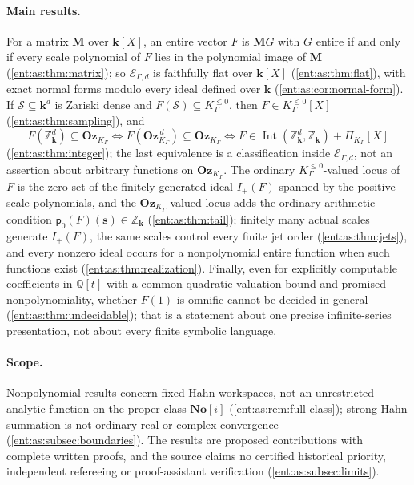\documentclass[11pt]{article}
\theoremstyle{plain}
\theoremstyle{plain}
\theoremstyle{plain}
\theoremstyle{definition}
\theoremstyle{definition}
\theoremstyle{definition}
\theoremstyle{definition}
\theoremstyle{remark}
\newcommand{\Q}{\mathbb Q}\newcommand{\Z}{\mathbb Z}\newcommand{\N}{\mathbb N}
\newcommand{\No}{\mathbf{No}}
\newcommand{\K}{K_\Gamma}\newcommand{\KD}{K_\Delta}
\newcommand{\kk}{\mathbf k}\newcommand{\PP}{\mathbb P}
\newcommand{\Oz}{\mathbf{Oz}}\newcommand{\Ed}{\mathcal E_{\Gamma,d}}
\newcommand{\Kle}{K_\Gamma^{\le0}}\DeclareMathOperator{\Jac}{Jac}
\newcommand{\Zk}{\Z_{\kk}}\newcommand{\OzK}{\Oz_{\K}}
\newcommand{\PiK}{\Pi_{\K}}\newcommand{\pg}{\mathsf p}
\DeclareMathOperator{\Int}{Int}\DeclareMathOperator{\ct}{ct}
\begin{document}
\paragraph{Main results.} For a matrix $\mathbf M$ over $\kk[X]$, an entire
vector $F$ is $\mathbf MG$ with $G$ entire if and only if every scale
polynomial of $F$ lies in the polynomial image of $\mathbf M$
(\cref{ent:as:thm:matrix}); so $\Ed$ is faithfully flat over $\kk[X]$
(\cref{ent:as:thm:flat}), with exact normal forms modulo every ideal defined
over $\kk$ (\cref{ent:as:cor:normal-form}). If $\mathcal S\subseteq\kk^d$ is
Zariski dense and $F(\mathcal S)\subseteq\Kle$, then $F\in\Kle[X]$
(\cref{ent:as:thm:sampling}), and
\begin{equation}\label{ent:as:eq:int-intro}
 F(\Zk^d)\subseteq\OzK
 \iff F(\OzK^{\,d})\subseteq\OzK
 \iff F\in\Int(\Zk^d,\Zk)+\PiK[X]
\end{equation}
(\cref{ent:as:thm:integer}); the last equivalence is a classification inside
$\Ed$, not an assertion about arbitrary functions on $\OzK$. The ordinary
$\Kle$-valued locus of $F$ is the zero set of the finitely generated ideal
$I_+(F)$ spanned by the positive-scale polynomials, and the $\OzK$-valued locus
adds the ordinary arithmetic condition $\pg_0(F)(\mathbf s)\in\Zk$
(\cref{ent:as:thm:tail}); finitely many actual scales generate $I_+(F)$, the
same scales control every finite jet order (\cref{ent:as:thm:jets}), and every
nonzero ideal occurs for a nonpolynomial entire function when such functions
exist (\cref{ent:as:thm:realization}). Finally, even for explicitly computable
coefficients in $\Q[t]$ with a common quadratic valuation bound and promised
nonpolynomiality, whether $F(1)$ is omnific cannot be decided in general
(\cref{ent:as:thm:undecidable}); that is a statement about one precise
infinite-series presentation, not about every finite symbolic language.

\paragraph{Scope.} Nonpolynomial results concern fixed Hahn workspaces, not an
unrestricted analytic function on the proper class $\No[i]$
(\cref{ent:as:rem:full-class}); strong Hahn summation is not ordinary real or
complex convergence (\cref{ent:as:subsec:boundaries}). The results are proposed
contributions with complete written proofs, and the source claims no
certified historical priority, independent refereeing or proof-assistant
verification (\cref{ent:as:subsec:limits}).
\end{document}
